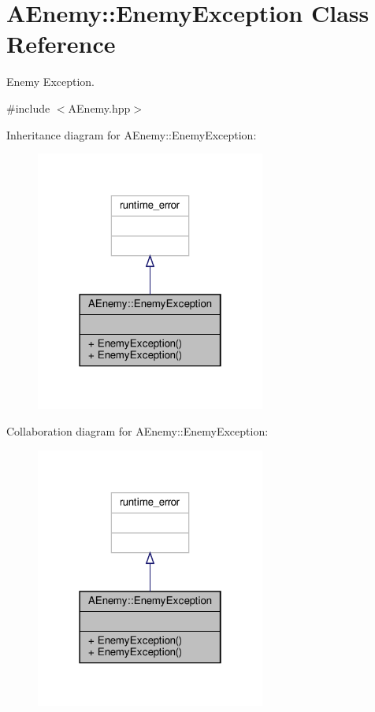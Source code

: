 \hypertarget{class_a_enemy_1_1_enemy_exception}{}\section{A\+Enemy\+:\+:Enemy\+Exception Class Reference}
\label{class_a_enemy_1_1_enemy_exception}


Enemy Exception.  




{\ttfamily \#include $<$A\+Enemy.\+hpp$>$}



Inheritance diagram for A\+Enemy\+:\+:Enemy\+Exception\+:
\nopagebreak
\begin{figure}[H]
\begin{center}
\leavevmode
\includegraphics[width=214pt]{class_a_enemy_1_1_enemy_exception__inherit__graph}
\end{center}
\end{figure}


Collaboration diagram for A\+Enemy\+:\+:Enemy\+Exception\+:
\nopagebreak
\begin{figure}[H]
\begin{center}
\leavevmode
\includegraphics[width=214pt]{class_a_enemy_1_1_enemy_exception__coll__graph}
\end{center}
\end{figure}
